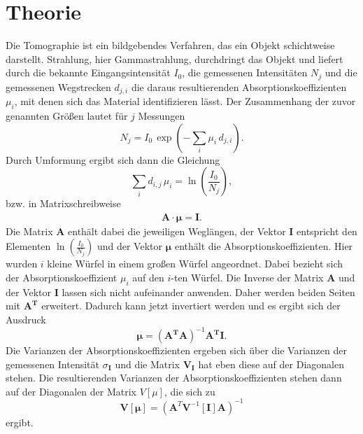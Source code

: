 \section{Theorie}

Die Tomographie ist ein bildgebendes Verfahren, das ein Objekt schichtweise darstellt. Strahlung, hier Gammastrahlung, durchdringt das Objekt und liefert durch die bekannte Eingangsintensität $I_0$, die gemessenen Intensitäten $N_j$ und die gemessenen Wegstrecken $d_{j,i}$ die daraus resultierenden Absorptionskoeffizienten $\mu_i$, mit denen sich das Material identifizieren lässt. 
Der Zusammenhang der zuvor genannten Größen lautet für $j$ Messungen
\begin{equation*}
    N_j = I_0 \, \exp\left(- \sum_{i} \mu_i \, d_{j,i} \right).
\end{equation*}
Durch Umformung ergibt sich dann die Gleichung 
\begin{equation}\label{eq:linearKoeff}
    \sum_i d_{i,j} \, \mu_i = \ln \left( \frac{I_0}{N_j} \right),
\end{equation}
bzw. in Matrixschreibweise 
\begin{align}\label{eq:LGS_mu}
\mathbf{A} \cdot \symbf{\mu} = \mathbf{I}.
\end{align}
Die Matrix $\mathbf{A}$ enthält dabei die jeweiligen Weglängen, der Vektor $\mathbf{I}$ entspricht den Elementen $\ln\! \left( \frac{I_0}{N_j} \right)$ und der Vektor $\symbf{\mu}$ enthält die Absorptionskoeffizienten.
Hier wurden $i$ kleine Würfel in einem großen Würfel angeordnet. Dabei bezieht sich der Absorptionskoeffizient $\mu_i$ auf den $i$-ten Würfel.
Die Inverse der Matrix $\mathbf{A}$ und der Vektor $\mathbf{I}$ lassen sich nicht aufeinander anwenden. Daher werden beiden Seiten mit $\mathbf{A^T}$ erweitert. Dadurch kann jetzt invertiert werden und es ergibt sich der Ausdruck 
\begin{equation*}
    \symbf{\mu} = \left( \mathbf{A^T} \mathbf{A} \right)^{-1} \mathbf{A^T} \mathbf{I}.
\end{equation*}
Die Varianzen der Absorptionskoeffizienten ergeben sich über die Varianzen der gemessenen Intensität $\sigma_{\mathbf{I}}$ und die Matrix $\mathbf{V_{I}}$ hat eben diese auf der Diagonalen stehen.
Die resultierenden Varianzen der Absorptionskoeffizienten stehen dann auf der Diagonalen der Matrix $V[\mu]$, die sich zu 
\begin{equation}\label{eq:kov}
    \mathbf{V}[\symbf{\mu}] = \left(\mathbf{A}^T\mathbf{V}^{-1}[\mathbf{I}]\mathbf{A}\right)^{-1}
\end{equation}
ergibt.

